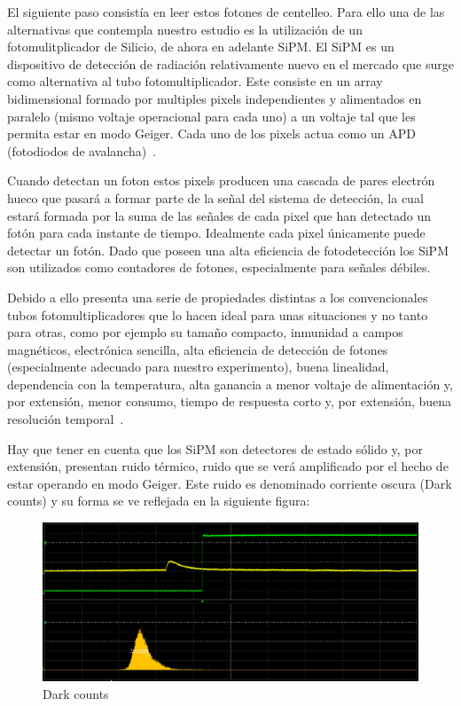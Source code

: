 El siguiente paso consistía en leer estos fotones de centelleo. Para ello una de las alternativas que contempla nuestro estudio es la utilización de un fotomulitplicador de Silicio, de ahora en adelante SiPM. El SiPM es un dispositivo de detección de radiación relativamente nuevo en el mercado que surge como alternativa al tubo fotomultiplicador. Este consiste en un array bidimensional formado por multiples pixels independientes y alimentados en paralelo (mismo voltaje operacional para cada uno) a un voltaje tal que les permita estar en modo Geiger. Cada uno de los pixels actua como un APD (fotodiodos de avalancha)~\cite{TFMSiPM2}.

Cuando detectan un foton estos pixels producen una cascada de pares electrón hueco que pasará a formar parte de la señal del sistema de detección, la cual estará formada por la suma de las señales de cada pixel que han detectado un fotón para cada instante de tiempo. Idealmente cada pixel únicamente puede detectar un fotón. Dado que poseen una alta eficiencia de fotodetección los SiPM son utilizados como contadores de fotones, especialmente para señales débiles.

Debido a ello presenta una serie de propiedades distintas a los convencionales tubos fotomultiplicadores que lo hacen ideal para unas situaciones y no tanto para otras, como por ejemplo su tamaño compacto, inmunidad a campos magnéticos, electrónica sencilla, alta eficiencia de detección de fotones (especialmente adecuado para nuestro experimento), buena linealidad, dependencia con la temperatura, alta ganancia a menor voltaje de alimentación y, por extensión, menor consumo, tiempo de respuesta corto y, por extensión, buena resolución temporal~\cite{AMFNP}.

Hay que tener en cuenta que los SiPM son detectores de estado sólido y, por extensión, presentan ruido térmico, ruido que se verá amplificado por el hecho de estar operando en modo Geiger. Este ruido es denominado corriente oscura (Dark counts) y su forma se ve reflejada en la siguiente figura:

\begin{figure}[hbtp]
\centering
\includegraphics[scale=0.2]{pedestal.png}
\caption{Dark counts\label{Darkcounts}}
\end{figure}

